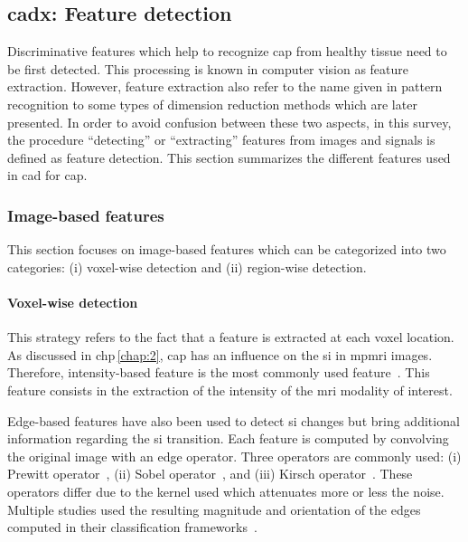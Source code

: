 \subsection{\acs*{cadx}: Feature detection} \label{subsec:chp3:img-clas:CADX-fea-dec}

Discriminative features which help to recognize \ac{cap} from healthy tissue need to be first detected.
This processing is known in computer vision as feature extraction. 
However, feature extraction also refer to the name given in pattern recognition to some types of dimension reduction methods which are later presented.
In order to avoid confusion between these two aspects, in this survey, the procedure ``detecting'' or ``extracting'' features from images and signals is defined as feature detection.
This section summarizes the different features used in \ac{cad} for \ac{cap}.

\subsubsection{Image-based features}\label{subsubsec:chp3:img-clas:CADX-fea-dec:Img-fea}

This section focuses on image-based features which can be categorized into two categories: (i) voxel-wise detection and (ii) region-wise detection.

\paragraph{Voxel-wise detection}
This strategy refers to the fact that a feature is extracted at each voxel location.
As discussed in \acs{chp}\,\ref{chap:2}, \ac{cap} has an influence on the \ac{si} in \ac{mpmri} images.
Therefore, intensity-based feature is the most commonly used feature~\cite{Ampeliotis2007,Ampeliotis2008,Vos2008,rampun2016computerb,rampun2015classifying,Giannini2013,Artan2009,Artan2010,Chan2003,Langer2009,Litjens2011,Litjens2012,Litjens2014,Liu2009,Ozer2009,Ozer2010,trigui2016classification,trigui2017automatic,cameron2014multiparametric,cameron2016maps,khalvati2015automated,chung2015prostate,giannini2015fully,Niaf2011,Niaf2012,lehaire2014computer}.
This feature consists in the extraction of the intensity of the \ac{mri} modality of interest.

Edge-based features have also been used to detect \ac{si} changes but bring additional information regarding the \ac{si} transition.
Each feature is computed by convolving the original image with an edge operator.
Three operators are commonly used: (i) Prewitt operator~\cite{Prewitt1970}, (ii) Sobel operator~\cite{Sobel1970}, and (iii) Kirsch operator~\cite{Kirsch1971}.
These operators differ due to the kernel used which attenuates more or less the noise.
Multiple studies used the resulting magnitude and orientation of the edges computed in their classification frameworks~\cite{Niaf2011,Niaf2012,Tiwari2009a,Tiwari2010,Tiwari2013,Viswanath2008,Viswanath2011,rampun2016quantitative,rampun2015computer,rampun2016computer,lehaire2014computer,khalvati2015automated,chung2015prostate}.

